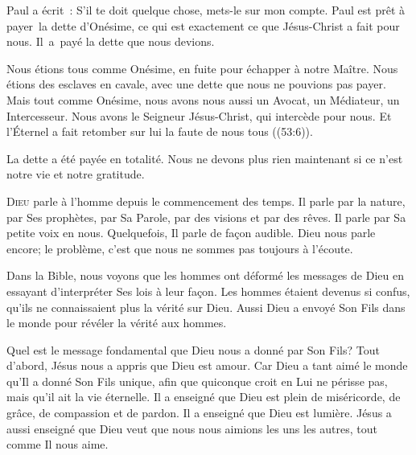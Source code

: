 
Paul a écrit~: 
 \og S'il 
 te doit quelque chose, mets-le sur mon compte. \fg{}
 Paul est prêt à payer~la dette d'Onésime,
 ce qui est 
 exactement ce que Jésus-Christ a fait pour nous.
 Il~a~payé la dette que nous devions. 

Nous étions tous comme Onésime, en fuite pour échapper à notre Maître.
 Nous étions des esclaves en cavale, avec une dette que nous ne pouvions
 pas payer.
 Mais tout comme Onésime, nous avons nous aussi un Avocat, un Médiateur,
 un Intercesseur. Nous avons le Seigneur Jésus-Christ,
 qui intercède pour nous.
 \og Et l'Éternel a fait retomber sur lui la faute de nous tous \fg{}
 ((53:6)). 

La dette a été payée en totalité.
 Nous ne devons plus rien maintenant
 \ocadr si ce n'est notre vie et notre gratitude.

\dvrule






\lettrine{D}{ieu} parle à l'homme depuis le commencement des temps.
 Il parle par la nature, par Ses prophètes, par Sa Parole, par des visions
 et par des rêves.
 Il parle par Sa petite voix en nous. Quelquefois, Il parle de façon audible.
 Dieu nous parle encore; le problème, c'est que nous ne sommes pas toujours
 à l'écoute. 

Dans la Bible, nous voyons que les hommes ont déformé les messages de Dieu
 en essayant d'interpréter Ses lois à leur façon.
 Les hommes étaient devenus si confus, qu'ils ne connaissaient plus
 la vérité sur Dieu.
 Aussi Dieu a envoyé Son Fils dans le monde
 pour révéler la vérité aux hommes. 


Quel est le message fondamental que Dieu nous a donné par Son Fils?
 Tout d'abord, Jésus nous a appris que Dieu est amour.
 \og Car Dieu a tant aimé le monde qu'Il a donné Son Fils unique,
 afin que quiconque croit en Lui ne périsse pas, mais qu'il ait
 la vie éternelle. \fg{}
 Il a enseigné que Dieu est plein de miséricorde, de grâce,
 de compassion et de pardon. Il a enseigné que Dieu est lumière.
 Jésus a aussi enseigné que Dieu veut que nous nous aimions
 les uns les autres, tout comme Il nous aime. 

